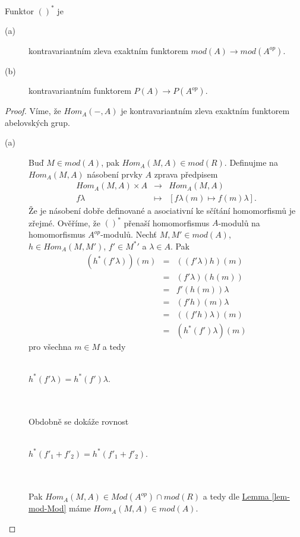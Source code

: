      \begin{thm}\label{lem-star}
       Funktor $()^*$ je
       \begin{description}
         \item[(a)] kontravariantním zleva exaktním funktorem $mod(A)\rightarrow mod(A^{op})$. 
         \item[(b)] kontravariantním funktorem $P(A)\rightarrow P(A^{op})$.
       \end{description}
     \end{thm}
     \begin{proof}
       Víme, že $Hom_A(-,A)$ je kontravariantním zleva exaktním funktorem 
       abelovských grup.
       \begin{description}
         \item[(a)] Buď $M\in mod(A)$, pak $Hom_A(M,A)\in mod(R)$. Definujme na 
         $Hom_A(M,A)$ násobení prvky $A$ zprava předpisem 
         \begin{eqnarray} 
           Hom_A(M,A)\times A&\to& Hom_A(M,A)\nonumber \\
            f\lambda &\mapsto& [f\lambda(m) \mapsto f(m)\lambda]. \nonumber 
         \end{eqnarray}          
         Že je násobení dobře definované a asociativní ke sčítání homomorfismů je zřejmé.
         Ověříme, že $()^*$ přenaší homomorfismus $A$-modulů na homomorfismus 
         $A^{op}$-modulů. Nechť $M,M'\in mod(A)$, $h\in Hom_A(M,M')$, $f'\in M^*'$ 
         a $\lambda\in A$. Pak
         \begin{eqnarray}
           (h^*(f'\lambda))(m)&=& ((f'\lambda)h)(m)\nonumber \\
           &=& (f'\lambda)(h(m)) \nonumber \\
           &=& f'(h(m))\lambda \nonumber \\
           &=& (f'h)(m)\lambda\nonumber \\
           &=& ((f'h)\lambda)(m)\nonumber \\
           &=& (h^*(f')\lambda)(m)\nonumber 
         \end{eqnarray}
         pro všechna $m\in M$ a tedy \\\\
         \centerline{$h^*(f'\lambda)=h^*(f')\lambda$.}\\\\
         Obdobně se dokáže rovnost \\\\
         \centerline{$h^*(f'_1 + f'_2)=h^*(f'_1 + f'_2)$.}\\\\
         Pak $Hom_A(M,A)\in Mod(A^{op})\cap mod(R)$ a tedy dle 
           \hyperref[lem-mod-Mod]{Lemma \ref*{lem-mod-Mod}} máme $Hom_A(M,A)\in 
           mod(A)$.
           

\end{description}
\end{proof}
